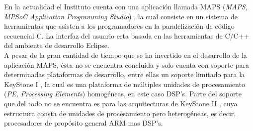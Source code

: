 En la actualidad el Instituto cuenta con una aplicación llamada MAPS (\textit{MAPS, MPSoC Application Programming Studio}) \cite{MAPS1}, la cual
consiste en un sistema de herramientas que asisten a los programadores en la paralelización de código secuencial C. La interfaz del usuario
esta basada en las herramientas de C/C++ del ambiente de desarrollo Eclipse.\\

A pesar de la gran cantidad de tiempo que se ha invertido en el desarrollo de la aplicación MAPS, ésta no se encuentra concluida y solo 
cuenta con soporte para determinadas plataformas de desarrollo, entre ellas un soporte limitado para la KeyStone I \cite{KSI1}, la cual es
una plataforma de múltiples unidades de procesamiento (\textit{PE, Processing Elements}) homogéneas, en este caso DSP's. Parte del soporte 
que del todo no se encuentra es para las arquitecturas de KeyStone II \cite{KSII1}, cuya estructura consta de unidades de procesamiento 
pero heterogéneas, es decir, procesadores de propósito general ARM mas DSP's.


